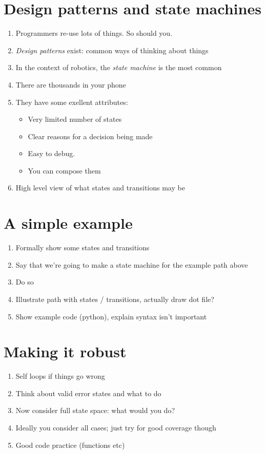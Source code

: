 \documentclass[a4paper,10pt]{article}
\begin{document}
\section{Design patterns and state machines}
\begin{enumerate}
\item Programmers re-use lots of things. So should you.
\item \textit{Design patterns} exist: common ways of thinking about things
\item In the context of robotics, the \textit{state machine} is the most common
\item There are thousands in your phone
\item They have some exellent attributes:
\begin{itemize}
	\item Very limited number of states
	\item Clear reasons for a decision being made
	\item Easy to debug.
	\item You can compose them
\end{itemize}
\item High level view of what states and transitions may be
\end{enumerate}

\section{A simple example}
\begin{enumerate}
\item Formally show some states and transitions
\item Say that we're going to make a state machine for the example path above
\item Do so
\item Illustrate path with states / transitions, actually draw dot file?
\item Show example code (python), explain syntax isn't important
\end{enumerate}

\section{Making it robust}
\begin{enumerate}
\item Self loops if things go wrong
\item Think about valid error states and what to do
\item Now consider full state space: what would you do?
\item Ideally you consider all cases; just try for good coverage though
\item Good code practice (functions etc)
\end{enumerate}
\end{document}
